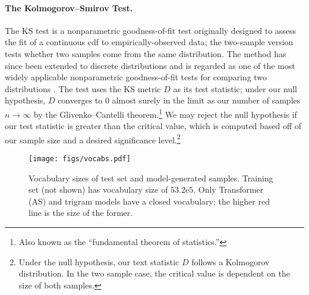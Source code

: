 \documentclass[11pt,a4paper]{article}
\newcommand{\calS}{\mathcal{S}}
\newcommand{\note}[4][]{\todo[author=#2,color=#3,size=\scriptsize,fancyline,caption={},#1]{#4}} %
\newcommand{\clara}[2][]{\note[#1]{clara}{orange}{#2}}
\begin{document}


\paragraph{The Kolmogorov--Smirov Test.} The KS test \cite{smirnov1948} is a nonparametric goodness-of-fit test originally designed to assess the fit of a continuous cdf to empirically-observed data; the two-sample version tests whether two samples come from the same distribution. The method has since been extended to discrete distributions and is regarded as one of the most widely applicable nonparametric goodness-of-fit tests for comparing two distributions \cite{discrete-gof,validation}. The test uses the  KS metric $D$ as its test statistic; under our null hypothesis, $D$ converges to 0 almost surely in the limit as our number of samples $n \rightarrow \infty$ by the Glivenko–Cantelli theorem.\footnote{Also known as the “fundamental theorem of statistics.”}
We may reject the null hypothesis if our test statistic is greater than the critical value, which is computed based off of our sample size and a desired significance level.\footnote{Under the null hypothesis, our text statistic $D$ follows a Kolmogorov distribution. In the two sample case, the critical value is dependent on the size of both samples.}




\begin{figure*}[!htpb]
\centering
    \texttt{[image: figs/vocabs.pdf]}
  \caption{Vocabulary sizes of test set and model-generated samples. Training set (not shown) has vocabulary size of $53.2\mathrm{e}{5}$. Only Transformer (AS) and trigram models have a closed vocabulary; the higher red line is the size of the former. }
    \label{fig:vocab}
    \vspace{-5pt}
\end{figure*}
\end{document}
